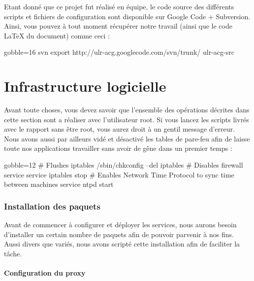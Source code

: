 \documentclass[11pt,a4paper]{report}
\begin{document}
            Etant donné que ce projet fut réalisé en équipe, le code source des différents scripts et fichiers de configuration sont disponible sur Google Code + Subversion. Ainsi, vous pouvez à tout moment récupérer notre travail (ainsi que le code {\LaTeX} du document) comme ceci :\\
            
            \begin{bashcode*}{gobble=16}
                svn export http://ulr-acg.googlecode.com/svn/trunk/ ulr-acg-src
            \end{bashcode*}
            
    
    \part{Infrastructure logicielle}
        
        Avant toute choses, vous devez savoir que l'ensemble des opérations décrites dans cette section sont a réaliser avec l'utilisateur root. Si vous lancez les scripts livrés avec le rapport sans être root, vous aurez droit à un gentil message d'erreur.\\
        
        Nous avons aussi par ailleurs vidé et désactivé les tables de pare-feu afin de laisse toute nos applications travailler sans avoir de gêne dans un premier temps :\\
        
        \begin{bashcode*}{gobble=12}
            # Flushes iptables
            /sbin/chkconfig --del iptables
            # Disables firewall service
            service iptables stop
            # Enables Network Time Protocol to sync time between machines
            service ntpd start
        \end{bashcode*}
        
        \section{Installation des paquets}
            
            Avant de commencer à configurer et déployer les services, nous aurons besoin d'installer un certain nombre de paquets afin de pouvoir parvenir à nos fins. Aussi divers que variés, nous avons scripté cette installation afin de faciliter la tâche.\\
            
            \subsection{Configuration du proxy}
            
\end{document}

